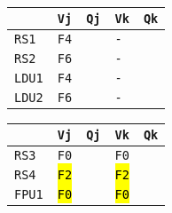 \begin{enumerate}
    \begin{minipage}{0.45\textwidth}
        \centering
        \begin{tabular}{@{} l | l l l l @{}}
            \toprule
                & \texttt{Vj} & \texttt{Qj} & \texttt{Vk} & \texttt{Qk} \\
            \midrule
            \texttt{RS1} & \texttt{F4} & & \texttt{-} & \\ [.3em]
            \texttt{RS2} & \texttt{F6} & & \texttt{-} & \\
            \cmidrule{1-5}
            \texttt{LDU1} & \texttt{F4} & & \texttt{-} & \\ [.3em]
            \texttt{LDU2} & \texttt{F6} & & \texttt{-} & \\
            \bottomrule
        \end{tabular}
    \end{minipage}
    \hfill
    \begin{minipage}{0.45\textwidth}
        \centering
        \begin{tabular}{@{} l | l l l l @{}}
            \toprule
            & \texttt{Vj} & \texttt{Qj} & \texttt{Vk} & \texttt{Qk} \\
            \midrule
            \texttt{RS3} & \texttt{F0} & & \texttt{F0} & \\ [.3em]
            \texttt{RS4} & \hl{\texttt{F2}} & & \hl{\texttt{F2}} & \\
            \cmidrule{1-5}
            \texttt{FPU1} & \hl{\texttt{F0}} & & \hl{\texttt{F0}} & \\
            \bottomrule
        \end{tabular}
    \end{minipage}


\end{enumerate}
